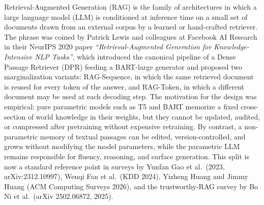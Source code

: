 Retrieval-Augmented Generation (RAG) is the family of architectures in which a large language model (LLM) is conditioned at inference time on a small set of documents drawn from an external corpus by a learned or hand-crafted retriever. The phrase was coined by Patrick Lewis and colleagues at Facebook AI Research in their NeurIPS 2020 paper \emph{``Retrieval-Augmented Generation for Knowledge-Intensive NLP Tasks''}, which introduced the canonical pipeline of a Dense Passage Retriever (DPR) feeding a BART-large generator and proposed two marginalization variants: RAG-Sequence, in which the same retrieved document is reused for every token of the answer, and RAG-Token, in which a different document may be used at each decoding step. The motivation for the design was empirical: pure parametric models such as T5 and BART memorize a fixed cross-section of world knowledge in their weights, but they cannot be updated, audited, or compressed after pretraining without expensive retraining. By contrast, a non-parametric memory of textual passages can be edited, version-controlled, and grown without modifying the model parameters, while the parametric LLM remains responsible for fluency, reasoning, and surface generation. This split is now a standard reference point in surveys by Yunfan Gao et al.~(2023, arXiv:2312.10997), Wenqi Fan et al.~(KDD 2024), Yizheng Huang and Jimmy Huang (ACM Computing Surveys 2026), and the trustworthy-RAG survey by Bo Ni et al.~(arXiv 2502.06872, 2025).
